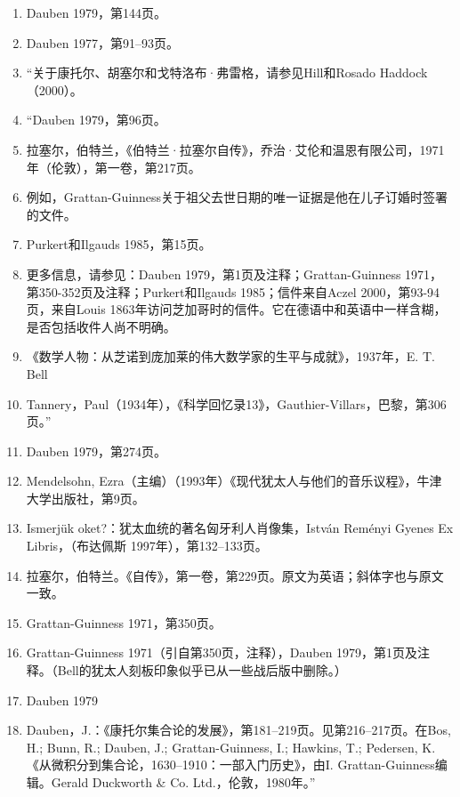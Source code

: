 \begin{enumerate}
\item Dauben 1979，第144页。
\item Dauben 1977，第91–93页。
\item “关于康托尔、胡塞尔和戈特洛布·弗雷格，请参见Hill和Rosado Haddock（2000）。  
\item “Dauben 1979，第96页。  
\item 拉塞尔，伯特兰，《伯特兰·拉塞尔自传》，乔治·艾伦和温恩有限公司，1971年（伦敦），第一卷，第217页。  
\item 例如，Grattan-Guinness关于祖父去世日期的唯一证据是他在儿子订婚时签署的文件。  
\item Purkert和Ilgauds 1985，第15页。  
\item 更多信息，请参见：Dauben 1979，第1页及注释；Grattan-Guinness 1971，第350-352页及注释；Purkert和Ilgauds 1985；信件来自Aczel 2000，第93-94页，来自Louis 1863年访问芝加哥时的信件。它在德语中和英语中一样含糊，是否包括收件人尚不明确。  
\item 《数学人物：从芝诺到庞加莱的伟大数学家的生平与成就》，1937年，E. T. Bell  
\item Tannery，Paul（1934年），《科学回忆录13》，Gauthier-Villars，巴黎，第306页。”
\item Dauben 1979，第274页。  
\item Mendelsohn, Ezra（主编）（1993年）《现代犹太人与他们的音乐议程》，牛津大学出版社，第9页。  
\item Ismerjük oket?：犹太血统的著名匈牙利人肖像集，István Reményi Gyenes Ex Libris，（布达佩斯 1997年），第132–133页。  
\item 拉塞尔，伯特兰。《自传》，第一卷，第229页。原文为英语；斜体字也与原文一致。  
\item Grattan-Guinness 1971，第350页。  
\item Grattan-Guinness 1971（引自第350页，注释），Dauben 1979，第1页及注释。（Bell的犹太人刻板印象似乎已从一些战后版中删除。）  
\item Dauben 1979  
\item Dauben，J.：《康托尔集合论的发展》，第181–219页。见第216–217页。在Bos, H.; Bunn, R.; Dauben, J.; Grattan-Guinness, I.; Hawkins, T.; Pedersen, K.《从微积分到集合论，1630–1910：一部入门历史》，由I. Grattan-Guinness编辑。Gerald Duckworth & Co. Ltd.，伦敦，1980年。”
\end{enumerate}
